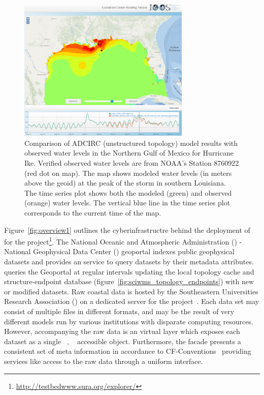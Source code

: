 \begin{figure}[ht!]
  \centering
  \includegraphics[height=2.7in]{../figs/SciWMS_ModelObsComparison_crop_373_8_1052_879}
  \caption{Comparison of ADCIRC (unstructured topology) model results
    with observed water levels in the Northern Gulf of Mexico for
    Hurricane Ike. Verified observed water levels are from NOAA's
    Station 8760922 (red dot on map). The map shows modeled water
    levels (in meters above the geoid) at the peak of the storm in
    southern Louisiana. The time series plot shows both the modeled
    (green) and observed (orange) water levels. The vertical blue line
    in the time series plot corresponds to the current time of the
    map.}
  \label{fig:adcirc_comp}
\end{figure}

Figure~\ref{fig:overview1} outlines the cyberinfrastructre behind the
deployment of \sciwms{} for the \comt{}
project\footnote{\url{http://testbedwww.sura.org/explorer/}}. The
National Oceanic and Atmospheric Administration (\noaa{}) - National
Geophysical Data Center (\ngdc{}) geoportal indexes public geophysical
datasets and provides an \ogc{} \csw{} service to query datasets by
their metadata attributes. \sciwms{} queries the \ngdc{} Geoportal at
regular intervals updating the local topology cache and
structure-endpoint database
(figure~\ref{fig:sciwms_topology_endpoints}) with new or modified
datasets. Raw coastal data is hosted by the Southeastern Universities
Research Association (\sura{}) on a dedicated server for the \comt{}
project~\cite{luettich12}. Each data set may consist of multiple files
in different formats, and may be the result of very different models
run by various institutions with disparate computing
resources. However, accompanying the raw data is an \ncml{} virtual
layer which exposes each dataset as a single \netcdf{}~\cite{netcdf},
\opendap{}~\cite{Cornillon03} accessible object. Furthermore, the
\ncml{} facade presents a consistent set of meta information in
accordance to CF-Conventions~\cite{cf} providing services like
\sciwms{} access to the raw data through a uniform interface.


